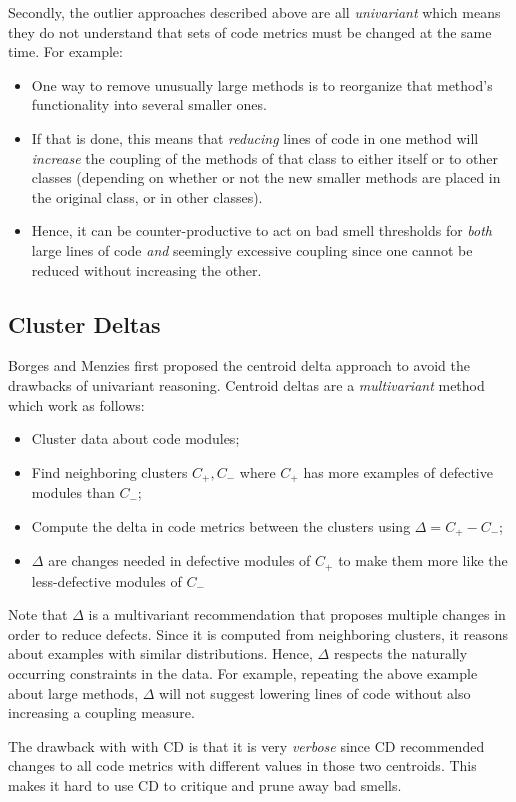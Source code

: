 \documentclass{sig-alternate}
\begin{document}
Secondly, the outlier approaches described above are all 
{\em univariant} which means
they do  not understand
that sets of code metrics must
be changed at the same time.
For example:
\begin{itemize} 
\item One way to remove unusually large methods is to reorganize that method's
functionality into several smaller ones. 
\item If that is done,
this means that {\em reducing} lines of code in one method
will {\em increase} the coupling of the methods of that class to
either itself or to other classes (depending on whether or not
the new smaller methods are placed in the original class, or in other classes).
\item
Hence, it can be counter-productive to act on bad smell thresholds for {\em both}
large lines of code {\em and} seemingly excessive coupling since
one cannot be reduced without increasing the other.
\end{itemize}
\subsection{Cluster Deltas}
Borges and Menzies first proposed the centroid delta approach to avoid the drawbacks of univariant reasoning.
Centroid deltas are a {\em multivariant} method which
work  as follows:
\begin{itemize}
    \item Cluster data about code modules;
    \item Find
neighboring clusters $C_+,C_-$ where $C_+$ has more examples of defective
modules than $C_-$;
\item Compute the  delta   in code metrics between the clusters using \mbox{$\Delta = C_+ - C_-$};
\item $\Delta$ are changes needed in defective modules of $C_+$ to
      make them more like the less-defective modules of $C_-$
\end{itemize}
Note that $\Delta$ is a multivariant recommendation
that proposes multiple changes in order to reduce defects.
Since it is computed
from neighboring clusters, it   reasons about
examples with similar distributions.  Hence,   $\Delta$  respects the naturally occurring constraints in the data. For example,
repeating the above example about large methods,   $\Delta$   will not  suggest lowering lines of code
without also increasing a coupling measure.

The drawback with with CD is that it is very {\em verbose}
since
CD   recommended changes to all code
metrics with different values in those two centroids. 
This makes it hard to use CD to   critique and prune away bad smells.
\end{document}
